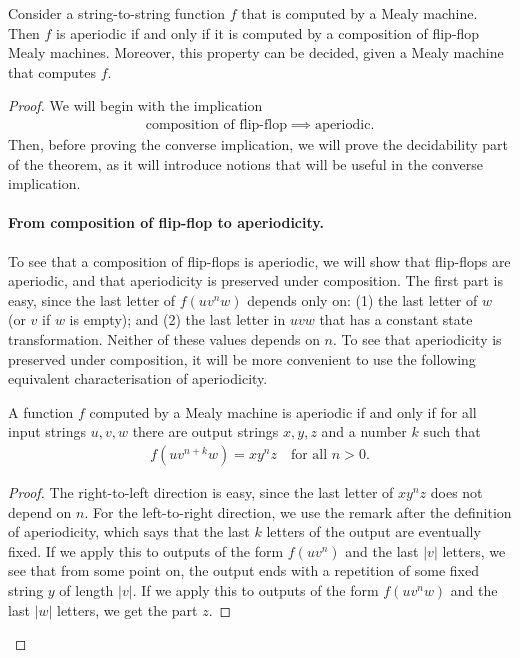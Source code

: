 \begin{theorem}\label{thm:aperiodic-mealy}
    Consider a string-to-string function $f$ that is computed by a Mealy machine. Then $f$ is aperiodic if and only if it is computed by a  composition of flip-flop Mealy machines. Moreover, this property can be decided, given a Mealy machine that computes $f$.
\end{theorem}



\begin{proof}
We will begin with the implication 
\begin{align*}
\text{composition of flip-flop} \implies \text{aperiodic}.
\end{align*}
Then, before proving the converse implication, we will prove the decidability part of the theorem, as it will introduce notions  that will be useful in the converse implication.

\paragraph*{From composition of flip-flop to aperiodicity.} To see that a composition of flip-flops is aperiodic, we will show that flip-flops are aperiodic, and that aperiodicity is preserved under composition.  The first part is easy, since the last letter of $f(uv^nw)$ depends only on: (1) the last letter of $w$ (or $v$ if $w$ is empty); and (2) the last letter in $uvw$ that has a constant state transformation. Neither of these values depends on $n$. To see that aperiodicity is preserved under composition, it will be more convenient to use the following equivalent characterisation of aperiodicity.
\begin{claim}\label{claim:aperiodic-pumping}
    A function  $f$ computed by a Mealy machine is aperiodic if and only if for all input strings $u,v,w$ there are output strings $x,y,z$ and a number $k$ such that
    \begin{align*}
    f(uv^{n+k}w) =  xy^n z \quad \text{for all $n > 0$}.
    \end{align*}
\end{claim}

\begin{proof}
    The right-to-left direction is easy, since the last letter of $xy^nz$ does not depend on $n$. For the left-to-right direction, we use the remark after the definition of aperiodicity, which says that the last $k$ letters of the output  are eventually fixed. If we apply this to outputs of the form $f(uv^n)$ and the last $|v|$ letters,  we see that  from some point on, the output ends with a repetition of some fixed string $y$ of length $|v|$. If we apply this to outputs of the form $f(uv^nw)$ and the last $|w|$ letters, we get the part $z$.
\end{proof}


\end{proof}
